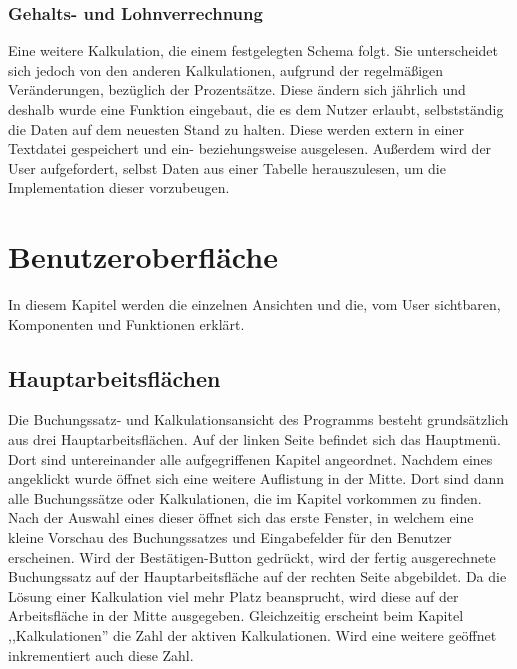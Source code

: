 \documentclass[12pt]{report}
\begin{document}
\subsection{Gehalts- und Lohnverrechnung}
Eine weitere Kalkulation, die einem festgelegten Schema folgt. Sie unterscheidet sich jedoch von den anderen Kalkulationen, aufgrund der regelmäßigen Veränderungen, bezüglich der Prozentsätze. Diese ändern sich jährlich und deshalb wurde eine Funktion eingebaut, die es dem Nutzer erlaubt, selbstständig die Daten auf dem neuesten Stand zu halten. Diese werden extern in einer Textdatei gespeichert und ein- beziehungsweise ausgelesen. Außerdem wird der User aufgefordert, selbst Daten aus einer Tabelle herauszulesen, um die Implementation dieser vorzubeugen.





\chapter{Benutzeroberfläche}
 
In diesem Kapitel werden die einzelnen Ansichten und die, vom User sichtbaren, Komponenten und Funktionen erklärt.
 
\section{Hauptarbeitsflächen}
Die Buchungssatz- und Kalkulationsansicht des Programms besteht grundsätzlich aus drei Hauptarbeitsflächen. Auf der linken Seite befindet sich das Hauptmenü. Dort sind untereinander alle aufgegriffenen Kapitel angeordnet. Nachdem eines angeklickt wurde öffnet sich eine weitere Auflistung in der Mitte. Dort sind dann alle Buchungssätze oder Kalkulationen, die im Kapitel vorkommen zu finden. Nach der Auswahl eines dieser öffnet sich das erste Fenster, in welchem eine kleine Vorschau des Buchungssatzes und Eingabefelder für den Benutzer erscheinen. Wird der Bestätigen-Button gedrückt, wird der fertig ausgerechnete Buchungssatz auf der Hauptarbeitsfläche auf der rechten Seite abgebildet. Da die Lösung einer Kalkulation viel mehr Platz beansprucht, wird diese auf der Arbeitsfläche in der Mitte ausgegeben. Gleichzeitig erscheint beim Kapitel ,,Kalkulationen'' die Zahl der aktiven Kalkulationen. Wird eine weitere geöffnet inkrementiert auch diese Zahl.
\end{document}
